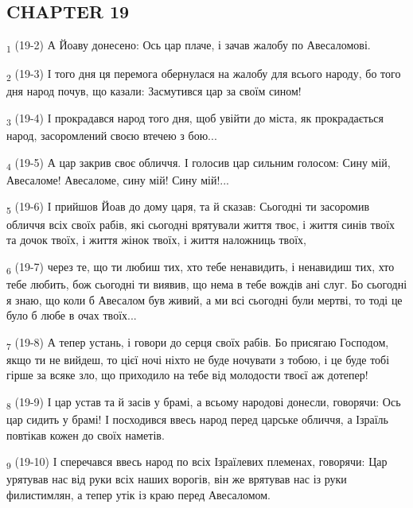 \subsection{CHAPTER 19}
\begin{tcolorbox}
\textsubscript{1} (19-2) А Йоаву донесено: Ось цар плаче, і зачав жалобу по Авесаломові.
\end{tcolorbox}
\begin{tcolorbox}
\textsubscript{2} (19-3) І того дня ця перемога обернулася на жалобу для всього народу, бо того дня народ почув, що казали: Засмутився цар за своїм сином!
\end{tcolorbox}
\begin{tcolorbox}
\textsubscript{3} (19-4) І прокрадався народ того дня, щоб увійти до міста, як прокрадається народ, засоромлений своєю втечею з бою...
\end{tcolorbox}
\begin{tcolorbox}
\textsubscript{4} (19-5) А цар закрив своє обличчя. І голосив цар сильним голосом: Сину мій, Авесаломе! Авесаломе, сину мій! Сину мій!...
\end{tcolorbox}
\begin{tcolorbox}
\textsubscript{5} (19-6) І прийшов Йоав до дому царя, та й сказав: Сьогодні ти засоромив обличчя всіх своїх рабів, які сьогодні врятували життя твоє, і життя синів твоїх та дочок твоїх, і життя жінок твоїх, і життя наложниць твоїх,
\end{tcolorbox}
\begin{tcolorbox}
\textsubscript{6} (19-7) через те, що ти любиш тих, хто тебе ненавидить, і ненавидиш тих, хто тебе любить, бож сьогодні ти виявив, що нема в тебе вождів ані слуг. Бо сьогодні я знаю, що коли б Авесалом був живий, а ми всі сьогодні були мертві, то тоді це було б любе в очах твоїх...
\end{tcolorbox}
\begin{tcolorbox}
\textsubscript{7} (19-8) А тепер устань, і говори до серця своїх рабів. Бо присягаю Господом, якщо ти не вийдеш, то цієї ночі ніхто не буде ночувати з тобою, і це буде тобі гірше за всяке зло, що приходило на тебе від молодости твоєї аж дотепер!
\end{tcolorbox}
\begin{tcolorbox}
\textsubscript{8} (19-9) І цар устав та й засів у брамі, а всьому народові донесли, говорячи: Ось цар сидить у брамі! І посходився ввесь народ перед царське обличчя, а Ізраїль повтікав кожен до своїх наметів.
\end{tcolorbox}
\begin{tcolorbox}
\textsubscript{9} (19-10) І сперечався ввесь народ по всіх Ізраїлевих племенах, говорячи: Цар урятував нас від руки всіх наших ворогів, він же врятував нас із руки филистимлян, а тепер утік із краю перед Авесаломом.
\end{tcolorbox}

